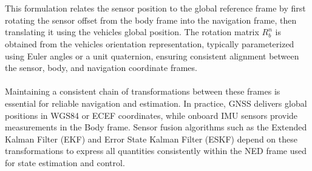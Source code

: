 \\ \\
This formulation relates the sensor position to the global reference frame by first rotating the sensor offset from the body frame into the navigation frame, then translating it using the vehicles global position. The rotation matrix $R_b^n$ is obtained from the vehicles orientation representation, typically parameterized using Euler angles or a unit quaternion, ensuring consistent alignment between the sensor, body, and navigation coordinate frames.
\\ \\
Maintaining a consistent chain of transformations between these frames is essential for reliable navigation and estimation. In practice, GNSS delivers global positions in WGS84 or ECEF coordinates, while onboard IMU sensors provide measurements in the Body frame. Sensor fusion algorithms such as the Extended Kalman Filter (EKF) and Error State Kalman Filter (ESKF) depend on these transformations to express all quantities consistently within the NED frame used for state estimation and control.
